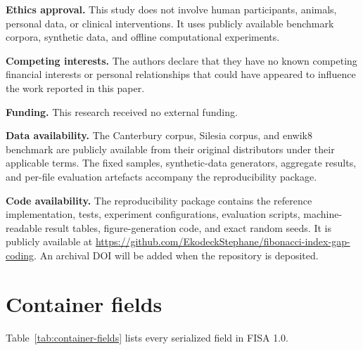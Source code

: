 \documentclass[a4paper,fleqn]{cas-dc}
\begin{document}
\noindent\textbf{Ethics approval.}
This study does not involve human participants, animals, personal data, or
clinical interventions. It uses publicly available benchmark corpora,
synthetic data, and offline computational experiments.

\medskip
\noindent\textbf{Competing interests.}
The authors declare that they have no known competing financial interests or
personal relationships that could have appeared to influence the work
reported in this paper.

\medskip
\noindent\textbf{Funding.}
This research received no external funding.

\medskip
\noindent\textbf{Data availability.}
The Canterbury corpus, Silesia corpus, and enwik8 benchmark are publicly
available from their original distributors under their applicable terms.
The fixed samples, synthetic-data generators, aggregate results, and per-file
evaluation artefacts accompany the reproducibility package.

\medskip
\noindent\textbf{Code availability.}
The reproducibility package contains the reference implementation, tests,
experiment configurations, evaluation scripts, machine-readable result
tables, figure-generation code, and exact random seeds. It is publicly
available at
\url{https://github.com/EkodeckStephane/fibonacci-index-gap-coding}.
An archival DOI will be added when the repository is deposited.

\appendix

\section{Container fields}
\label{app:format}

Table~\ref{tab:container-fields} lists every serialized field in FISA 1.0.
\end{document}
